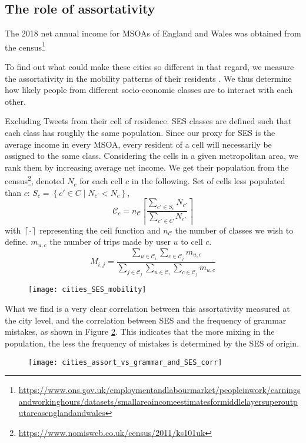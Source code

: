 \documentclass[../thesis.tex]{subfiles}
\begin{document}
\subsection{The role of assortativity}
The 2018 net annual income for \acp{MSOA} of England and Wales was obtained from the census\footnote{\url{https://www.ons.gov.uk/employmentandlabourmarket/peopleinwork/earningsandworkinghours/datasets/smallareaincomeestimatesformiddlelayersuperoutputareasenglandandwales}}

To find out what could
make these cities so different in that regard, we measure the assortativity in the
mobility patterns of their residents \cite{HilmanSocioeconomicBiases2022}. We thus
determine how likely people from different socio-economic classes are to interact with
each other.

Excluding Tweets from their cell of residence. \ac{SES} classes are defined such that each class has roughly the same population. Since our proxy for \ac{SES} is the average income in every \ac{MSOA}, every resident of a cell will necessarily be assigned to the same class. Considering the cells in a given metropolitan area, we rank them by increasing average net income. We get their population from the census\footnote{\url{https://www.nomisweb.co.uk/census/2011/ks101uk}}, denoted $N_c$ for each cell $c$ in the following.
Set of cells less populated than $c$: $S_c = \left\{ c' \in C \mid N_{c'} < N_c \right\}$, 
\begin{equation}
  \mathcal{C}_c = n_{\mathcal{C}} \left\lceil \frac{\sum_{c' \in S_c} N_{c'}}{\sum_{c' \in C} N_{c'}} \right\rceil
\end{equation}
with $\left\lceil \cdot \right\rceil$ representing the ceil function and $n_{\mathcal{C}}$ the number of classes we wish to define. $m_{u, c}$ the number of trips made by user $u$ to cell $c$. 
\begin{equation}
  M_{i, j} = \frac{
      \sum_{u \in \mathcal{C}_i} \sum_{c \in \mathcal{C}_j} m_{u, c}
    }{
      \sum_{j \in \mathcal{C}_j} \sum_{u \in \mathcal{C}_i} \sum_{c \in \mathcal{C}_j} m_{u, c}
    }
\end{equation}
\begin{figure}[h]
\centering
  \texttt{[image: cities\_SES\_mobility]}
  \caption{}
  \label{fig:cities_SES_mobility}
\end{figure}

What we find is a very clear correlation between this assortativity measured
at the city level, and the correlation between SES and the frequency of grammar
mistakes, as shown in Figure \ref{fig:cities_assort_vs_grammar_and_SES_corr}. This indicates that the more mixing in the
population, the less the frequency of mistakes is determined by the SES of origin.
\begin{figure}[hb]
\centering
  \texttt{[image: cities\_assort\_vs\_grammar\_and\_SES\_corr]}
  \caption{}
  \label{fig:cities_assort_vs_grammar_and_SES_corr}
\end{figure}
\end{document}
